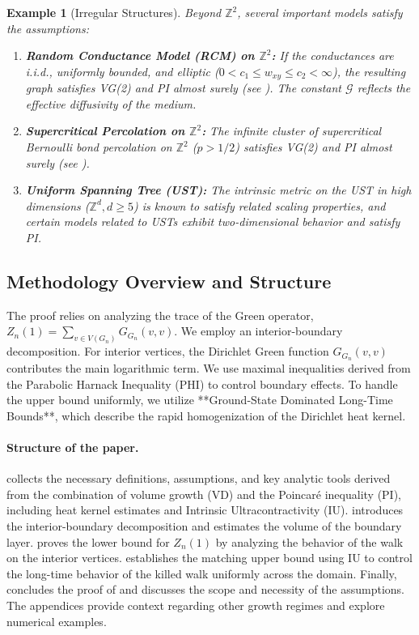 \documentclass[11pt]{article}
\numberwithin{equation}{section}
\newtheorem{example}[theorem]{Example}
\newcommand{\cG}{\mathcal{G}}
\begin{document}
\begin{example}[Irregular Structures]\label{ex:irregular}
Beyond $\mathbb{Z}^2$, several important models satisfy the assumptions:
\begin{enumerate}
    \item \textbf{Random Conductance Model (RCM) on $\mathbb{Z}^2$:} If the conductances are i.i.d., uniformly bounded, and elliptic ($0 < c_1 \leq w_{xy} \leq c_2 < \infty$), the resulting graph satisfies VG(2) and PI almost surely (see \cite{Biskup11}). The constant $\cG$ reflects the effective diffusivity of the medium.
    \item \textbf{Supercritical Percolation on $\mathbb{Z}^2$:} The infinite cluster of supercritical Bernoulli bond percolation on $\mathbb{Z}^2$ ($p>1/2$) satisfies VG(2) and PI almost surely (see \cite{Barlow04}).
    \item \textbf{Uniform Spanning Tree (UST):} The intrinsic metric on the UST in high dimensions ($\mathbb{Z}^d, d\geq 5$) is known to satisfy related scaling properties, and certain models related to USTs exhibit two-dimensional behavior and satisfy PI.
\end{enumerate}
\end{example}

\subsection{Methodology Overview and Structure}
The proof relies on analyzing the trace of the Green operator, $Z_n(1) = \sum_{v \in V(G_n)} G_{G_n}(v,v)$. We employ an interior-boundary decomposition. For interior vertices, the Dirichlet Green function $G_{G_n}(v,v)$ contributes the main logarithmic term. We use maximal inequalities derived from the Parabolic Harnack Inequality (PHI) to control boundary effects. To handle the upper bound uniformly, we utilize **Ground-State Dominated Long-Time Bounds**, which describe the rapid homogenization of the Dirichlet heat kernel.

\paragraph{Structure of the paper.}  collects the necessary definitions, assumptions, and key analytic tools derived from the combination of volume growth (VD) and the Poincaré inequality (PI), including heat kernel estimates and Intrinsic Ultracontractivity (IU).  introduces the interior-boundary decomposition and estimates the volume of the boundary layer.  proves the lower bound for $Z_n(1)$ by analyzing the behavior of the walk on the interior vertices.  establishes the matching upper bound using IU to control the long-time behavior of the killed walk uniformly across the domain. Finally,  concludes the proof of  and discusses the scope and necessity of the assumptions. The appendices provide context regarding other growth regimes and explore numerical examples.
\end{document}
